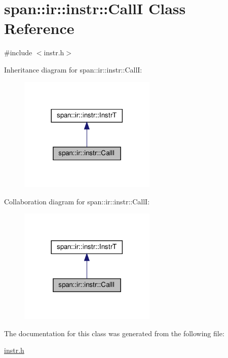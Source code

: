 \hypertarget{classspan_1_1ir_1_1instr_1_1CallI}{}\section{span\+:\+:ir\+:\+:instr\+:\+:CallI Class Reference}
\label{classspan_1_1ir_1_1instr_1_1CallI}


{\ttfamily \#include $<$instr.\+h$>$}



Inheritance diagram for span\+:\+:ir\+:\+:instr\+:\+:CallI\+:\nopagebreak
\begin{figure}[H]
\begin{center}
\leavevmode
\includegraphics[width=185pt]{classspan_1_1ir_1_1instr_1_1CallI__inherit__graph}
\end{center}
\end{figure}


Collaboration diagram for span\+:\+:ir\+:\+:instr\+:\+:CallI\+:\nopagebreak
\begin{figure}[H]
\begin{center}
\leavevmode
\includegraphics[width=185pt]{classspan_1_1ir_1_1instr_1_1CallI__coll__graph}
\end{center}
\end{figure}


The documentation for this class was generated from the following file\+:\begin{DoxyCompactItemize}
\item 
\hyperlink{instr_8h}{instr.\+h}\end{DoxyCompactItemize}
